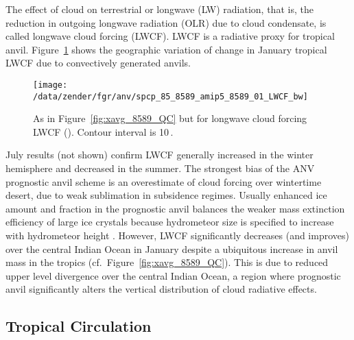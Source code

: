 \documentclass[twoside,agupp]{aguplus}
\begin{document}
The effect of cloud on terrestrial or longwave (LW) radiation, that
is, the reduction in outgoing longwave radiation (OLR) due to cloud
condensate, is called longwave cloud forcing (LWCF).
LWCF is a radiative proxy for tropical anvil.
Figure~\ref{fig:8589_LWCF} shows the geographic variation of change in
January tropical LWCF due to convectively generated anvils.
\begin{figure}
\begin{center}
\texttt{[image: /data/zender/fgr/anv/spcp\_85\_8589\_amip5\_8589\_01\_LWCF\_bw]}\vfill
\end{center}
\caption{
As in Figure~\ref{fig:xavg_8589_QC} but for longwave cloud forcing
LWCF (\wxmS). 
Contour interval is 10\,\wxmS. 
\label{fig:8589_LWCF}}   
\end{figure}
July results (not shown) confirm LWCF generally increased in the
winter hemisphere and decreased in the summer.
The strongest bias of the ANV prognostic anvil scheme is an
overestimate of cloud forcing over wintertime desert, due to weak
sublimation in subsidence regimes.
Usually enhanced ice amount and fraction in the prognostic
anvil balances the weaker mass extinction efficiency of large ice
crystals because hydrometeor size is specified to increase with
hydrometeor height \cite[]{KBB96}.
However, LWCF significantly decreases (and improves) over the central
Indian Ocean in January despite a ubiquitous increase in anvil mass in
the tropics (cf.\ Figure~\ref{fig:xavg_8589_QC}).  
This is due to reduced upper level divergence over the central Indian
Ocean, a region where prognostic anvil significantly alters the
vertical distribution of cloud radiative effects. 

\subsection{Tropical Circulation}\label{sec:cio}
\end{document}
